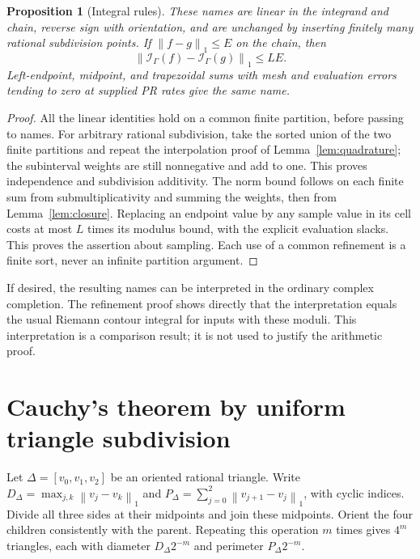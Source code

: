 \documentclass[11pt]{article}
\newtheorem{proposition}[theorem]{Proposition}
\theoremstyle{definition}
\newcommand{\norm}[1]{\left\lVert#1\right\rVert_1}
\newcommand{\Int}{\mathcal I}
\begin{document}
\begin{proposition}[Integral rules]\label{prop:rules}
These names are linear in the integrand and chain, reverse sign with
orientation, and are unchanged by inserting finitely many rational
subdivision points. If \(\norm{f-g}\le E\) on the chain, then
\begin{equation}\label{eq:integralbound}
 \norm{\Int_\Gamma(f)-\Int_\Gamma(g)}\le LE.
\end{equation}
Left-endpoint, midpoint, and trapezoidal sums with mesh and evaluation
errors tending to zero at supplied PR rates give the same name.
\end{proposition}
\begin{proof}
All the linear identities hold on a common finite partition, before
passing to names. For arbitrary rational subdivision, take the sorted
union of the two finite partitions and repeat the interpolation proof of
Lemma~\ref{lem:quadrature}; the subinterval weights are still
nonnegative and add to one. This proves independence and subdivision
additivity. The norm bound follows on each finite sum from
submultiplicativity and summing the weights, then from
Lemma~\ref{lem:closure}. Replacing an endpoint value by any sample value
in its cell costs at most \(L\) times its modulus bound, with the
explicit evaluation slacks. This proves the assertion about sampling.
Each use of a common refinement is a finite sort, never an infinite
partition argument.
\end{proof}

If desired, the resulting names can be interpreted in the ordinary
complex completion. The refinement proof shows directly that the
interpretation equals the usual Riemann contour integral for inputs
with these moduli. This interpretation is a comparison result; it is
not used to justify the arithmetic proof.

\section{Cauchy's theorem by uniform triangle subdivision}\label{sec:cauchy}

Let \(\Delta=[v_0,v_1,v_2]\) be an oriented rational triangle. Write
\(D_\Delta=\max_{j,k}\norm{v_j-v_k}\) and
\(P_\Delta=\sum_{j=0}^{2}\norm{v_{j+1}-v_j}\), with cyclic indices.
Divide all three sides at their midpoints and join these midpoints.
Orient the four children consistently with the parent. Repeating this
operation \(m\) times gives \(4^m\) triangles, each with diameter
\(D_\Delta2^{-m}\) and perimeter \(P_\Delta2^{-m}\).
\end{document}
